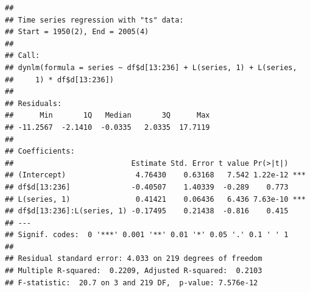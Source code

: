 \documentclass[
]{article}
\newenvironment{Shaded}{\begin{snugshade}}{\end{snugshade}}
\newcommand{\DecValTok}[1]{\textcolor[rgb]{0.00,0.00,0.81}{#1}}
\newcommand{\KeywordTok}[1]{\textcolor[rgb]{0.13,0.29,0.53}{\textbf{#1}}}
\newcommand{\NormalTok}[1]{#1}
\newcommand{\OperatorTok}[1]{\textcolor[rgb]{0.81,0.36,0.00}{\textbf{#1}}}
\newcommand{\StringTok}[1]{\textcolor[rgb]{0.31,0.60,0.02}{#1}}
\begin{document}
\begin{Shaded}
\end{Shaded}

\begin{verbatim}
## 
## Time series regression with "ts" data:
## Start = 1950(2), End = 2005(4)
## 
## Call:
## dynlm(formula = series ~ df$d[13:236] + L(series, 1) + L(series, 
##     1) * df$d[13:236])
## 
## Residuals:
##      Min       1Q   Median       3Q      Max 
## -11.2567  -2.1410  -0.0335   2.0335  17.7119 
## 
## Coefficients:
##                           Estimate Std. Error t value Pr(>|t|)    
## (Intercept)                4.76430    0.63168   7.542 1.22e-12 ***
## df$d[13:236]              -0.40507    1.40339  -0.289    0.773    
## L(series, 1)               0.41421    0.06436   6.436 7.63e-10 ***
## df$d[13:236]:L(series, 1) -0.17495    0.21438  -0.816    0.415    
## ---
## Signif. codes:  0 '***' 0.001 '**' 0.01 '*' 0.05 '.' 0.1 ' ' 1
## 
## Residual standard error: 4.033 on 219 degrees of freedom
## Multiple R-squared:  0.2209, Adjusted R-squared:  0.2103 
## F-statistic:  20.7 on 3 and 219 DF,  p-value: 7.576e-12
\end{verbatim}
\end{document}
